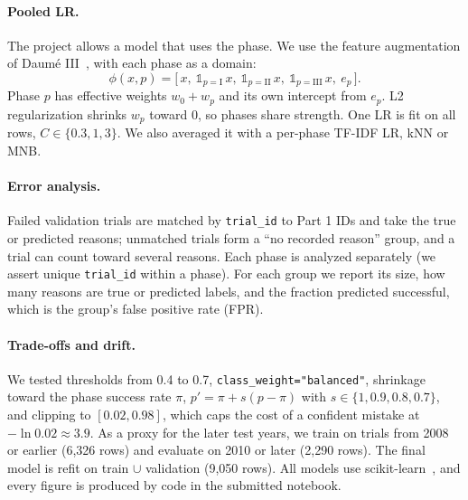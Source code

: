 \paragraph{Pooled LR.}
The project allows a model that uses the phase.
We use the feature augmentation of Daum\'e III~\cite{daume2007frustratingly}, with each phase as a domain:
\begin{equation}
\phi(x,p)=\big[\,x,\ \mathbb 1_{p=\mathrm{I}}\,x,\ \mathbb 1_{p=\mathrm{II}}\,x,\ \mathbb 1_{p=\mathrm{III}}\,x,\ e_p\,\big].
\end{equation}
Phase $p$ has effective weights $w_0+w_p$ and its own intercept from $e_p$.
L2 regularization shrinks $w_p$ toward 0, so phases share strength.
One LR is fit on all rows, $C\in\{0.3,1,3\}$.
We also averaged it with a per-phase TF-IDF LR, kNN or MNB.

\paragraph{Error analysis.}
Failed validation trials are matched by \texttt{trial\_id} to Part 1 IDs and take the true or predicted reasons; unmatched trials form a ``no recorded reason'' group, and a trial can count toward several reasons.
Each phase is analyzed separately (we assert unique \texttt{trial\_id} within a phase).
For each group we report its size, how many reasons are true or predicted labels, and the fraction predicted successful, which is the group's false positive rate (FPR).

\paragraph{Trade-offs and drift.}
We tested thresholds from 0.4 to 0.7, \texttt{class\_weight="balanced"}, shrinkage toward the phase success rate $\pi$, $p'=\pi+s(p-\pi)$ with $s\in\{1,0.9,0.8,0.7\}$, and clipping to $[0.02,0.98]$, which caps the cost of a confident mistake at $-\ln 0.02\approx 3.9$.
As a proxy for the later test years, we train on trials from 2008 or earlier (6,326 rows) and evaluate on 2010 or later (2,290 rows).
The final model is refit on train $\cup$ validation (9,050 rows).
All models use scikit-learn~\cite{pedregosa2011scikit}, and every figure is produced by code in the submitted notebook.
